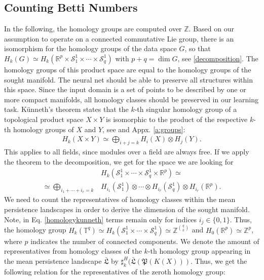 \documentclass[envcountsect,runningheads]{llncs}
\begin{document}
\subsection{Counting Betti Numbers}
In the following, the homology groups are computed over $\mathbb{Z}$. Based on our assumption to operate on a connected commutative Lie group, there is an isomorphism for the homology groups of the data space $G$, so that $H_k(G) \simeq H_k(\mathbb{R}^p \times \mathcal{S}^{1}_{1}\times\cdots\times\mathcal{S}^{1}_{q})$ with $p+q = \dim G$, see \ref{decomposition}. The homology groups of this product space are equal to the homology groups of the sought manifold. The neural net should be able to preserve all structures within this space. Since the input domain is a set of points to be described by one or more compact manifolds, all homology classes should be preserved in our learning task. Künneth's theorem states that the $k$-th singular homology group of a topological product space $X \times Y$ is isomorphic to the product of the respective $k$-th homology groups of $X$ and $Y$, see  and Appx. \ref{a:groups}:
\begin{align}
    H_k(X \times Y) \simeq \bigoplus_{i+j=k}H_i(X) \otimes H_j(Y).
\end{align}
This applies to all fields, since modules over a field are always free. If we apply the theorem to the decomposition, we get for the space we are looking for
\begin{align}
	\label{homologykunneth}
    &H_k(\mathcal{S}^{1}_{1}\times\cdots\times \mathcal{S}^{1}_{q}\times\mathbb{R}^p) \simeq \\
    \simeq \bigoplus_{i_{1} + \cdots + i_{r}=k} &H_{i_{1}}(\mathcal{S}^{1}_{1}) \otimes \cdots \otimes H_{i_{\hat{r}}}(\mathcal{S}^{1}_{q}) \otimes H_{i_{r}}(\mathbb{R}^{p}).
\end{align}
We need to count the representatives of homology classes within the mean persistence landscapes in order to derive the dimension of the sought manifold. Note, in Eq. \ref{homologykunneth} terms remain only for indices $i_{j} \in \{0,1\}$. Thus, the homology group $H_k(\mathbb{T}^{q}) \simeq H_k(\mathcal{S}^{1}_{1} \times \cdots \times \mathcal{S}^{1}_{q}) \simeq \mathbb{Z}^{{q\choose{k}}}$ and $H_0(\mathbb{R}^p)\simeq\mathbb{Z}^{p}$, where $p$ indicates the number of connected components. We denote the amount of representatives from homology classes of the $k$-th homology group appearing in the mean persistence landscape $\bar{\mathfrak{L}}$ by $\sharp^{H}_{k}(\bar{\mathfrak{L}}(\mathfrak{P}(K(X)))$. Thus, we get the following relation for the representatives of the zeroth homology group:
\end{document}
